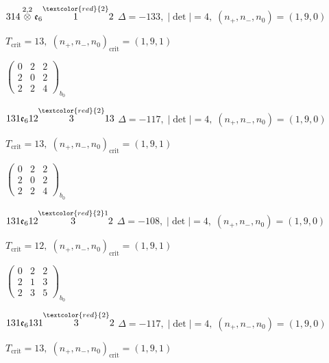 \documentclass[10pt]{article}
\begin{document}
$314\overset{2,2}{\otimes}\mathfrak{e}_6\overset{\textcolor{red}{2}}{1}2$ \quad $\Delta=-133,\; |\det|=4,\; (n_+,n_-,n_0)=(1,9,0)$

\hspace{1em}$T_{\text{crit}}=13,\; (n_+,n_-,n_0)_{\text{crit}}=(1,9,1)$

\hspace{2em}$\left(\begin{smallmatrix}0 & 2 & 2 \\ 2 & 0 & 2 \\ 2 & 2 & 4\end{smallmatrix}\right)_{\!b_0}$

\smallskip

$131\mathfrak{e}_612\overset{\textcolor{red}{2}}{3}13$ \quad $\Delta=-117,\; |\det|=4,\; (n_+,n_-,n_0)=(1,9,0)$

\hspace{1em}$T_{\text{crit}}=13,\; (n_+,n_-,n_0)_{\text{crit}}=(1,9,1)$

\hspace{2em}$\left(\begin{smallmatrix}0 & 2 & 2 \\ 2 & 0 & 2 \\ 2 & 2 & 4\end{smallmatrix}\right)_{\!b_0}$

\smallskip

$131\mathfrak{e}_612\overset{\textcolor{red}{2}1}{3}2$ \quad $\Delta=-108,\; |\det|=4,\; (n_+,n_-,n_0)=(1,9,0)$

\hspace{1em}$T_{\text{crit}}=12,\; (n_+,n_-,n_0)_{\text{crit}}=(1,9,1)$

\hspace{2em}$\left(\begin{smallmatrix}0 & 2 & 2 \\ 2 & 1 & 3 \\ 2 & 3 & 5\end{smallmatrix}\right)_{\!b_0}$

\smallskip

$131\mathfrak{e}_6131\overset{\textcolor{red}{2}}{3}2$ \quad $\Delta=-117,\; |\det|=4,\; (n_+,n_-,n_0)=(1,9,0)$

\hspace{1em}$T_{\text{crit}}=13,\; (n_+,n_-,n_0)_{\text{crit}}=(1,9,1)$
\end{document}

